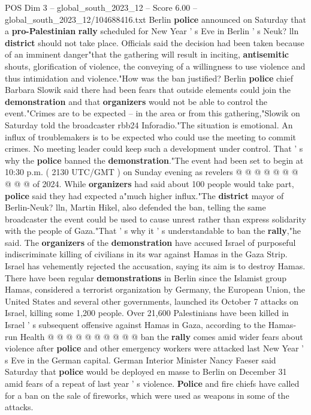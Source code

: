 \begin{textsample}{POS Dim 3 – global\_south\_2023\_12 – Score 6.00 – global\_south\_2023\_12/104688416.txt}  \label{ex:f3_pos_427}
Berlin \textbf{police} announced on Saturday that a \textbf{pro-Palestinian} \textbf{rally} scheduled for New Year ' s Eve in Berlin ' s Neuk? lln \textbf{district} should not take place.
Officials said the decision had been taken because of an imminent danger"that the gathering will result in inciting, \textbf{antisemitic} shouts, glorification of violence, the conveying of a willingness to use violence and thus intimidation and violence."How was the ban justified?
Berlin \textbf{police} chief Barbara Slowik said there had been fears that outside elements could join the \textbf{demonstration} and that \textbf{organizers} would not be able to control the event."Crimes are to be expected -- in the area or from this gathering,"Slowik on Saturday told the broadcaster rbb24 Inforadio."The situation is emotional.
An influx of troublemakers is to be expected who could use the meeting to commit crimes.
No meeting leader could keep such a development under control.
That ' s why the \textbf{police} banned the \textbf{demonstration}."The event had been set to begin at 10:30 p.m. ( 2130 UTC/GMT ) on Sunday evening as revelers @ @ @ @ @ @ @ @ @ @ of 2024.
While \textbf{organizers} had said about 100 people would take part, \textbf{police} said they had expected a"much higher influx."The \textbf{district} mayor of Berlin-Neuk? lln, Martin Hikel, also defended the ban, telling the same broadcaster the event could be used to cause unrest rather than express solidarity with the people of Gaza."That ' s why it ' s understandable to ban the \textbf{rally},"he said.
The \textbf{organizers} of the \textbf{demonstration} have accused Israel of purposeful indiscriminate killing of civilians in its war against Hamas in the Gaza Strip.
Israel has vehemently rejected the accusation, saying its aim is to destroy Hamas.
There have been regular \textbf{demonstrations} in Berlin since the Islamist group Hamas, considered a terrorist organization by Germany, the European Union, the United States and several other governments, launched its October 7 attacks on Israel, killing some 1,200 people.
Over 21,600 Palestinians have been killed in Israel ' s subsequent offensive against Hamas in Gaza, according to the Hamas-run Health @ @ @ @ @ @ @ @ @ @ ban the \textbf{rally} comes amid wider fears about violence after \textbf{police} and other emergency workers were attacked last New Year ' s Eve in the German capital.
German Interior Minister Nancy Faeser said Saturday that \textbf{police} would be deployed en masse to Berlin on December 31 amid fears of a repeat of last year ' s violence. \textbf{Police} and fire chiefs have called for a ban on the sale of fireworks, which were used as weapons in some of the attacks.

\end{textsample}
